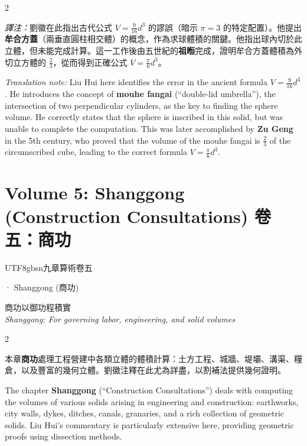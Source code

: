 \documentclass[10pt,a4paper]{article}
\begin{document}
\begin{paracol}{2}
\begin{leftcolumn*}
\textit{譯注：}劉徽在此指出古代公式 $V = \frac{9}{16}d^3$ 的謬誤（暗示 $\pi = 3$ 的特定配置）。他提出\textbf{牟合方蓋}（兩垂直圓柱相交體）的概念，作為求球體積的關鍵。他指出球內切於此立體，但未能完成計算。這一工作後由五世紀的\textbf{祖暅}完成，證明牟合方蓋體積為外切立方體的 $\frac{2}{3}$，從而得到正確公式 $V = \frac{\pi}{6}d^3$。
\end{leftcolumn*}
\begin{rightcolumn*}
\textit{Translation note:} Liu Hui here identifies the error in the ancient formula $V = \frac{9}{16}d^3$. He introduces the concept of \textbf{mouhe fangai} (``double-lid umbrella''), the intersection of two perpendicular cylinders, as the key to finding the sphere volume. He correctly states that the sphere is inscribed in this solid, but was unable to complete the computation. This was later accomplished by \textbf{Zu Geng} in the 5th century, who proved that the volume of the mouhe fangai is $\frac{2}{3}$ of the circumscribed cube, leading to the correct formula $V = \frac{\pi}{6}d^3$.
\end{rightcolumn*}
\end{paracol}

\newpage

\section{Volume 5: Shanggong (Construction Consultations) 卷五：商功}

\begin{volumeheader}{\begin{CJK}{UTF8}{gbsn}九章算術卷五\end{CJK} · Shanggong (商功)}
商功以御功程積實\\[0.2em]
\small\textit{Shanggong: For governing labor, engineering, and solid volumes}
\end{volumeheader}

\vspace{0.3cm}

\begin{paracol}{2}
\begin{leftcolumn*}
本章\textbf{商功}處理工程營建中各類立體的體積計算：土方工程、城牆、堤壩、溝渠、糧倉，以及豐富的幾何立體。劉徽注釋在此尤為詳盡，以割補法提供幾何證明。
\end{leftcolumn*}
\begin{rightcolumn*}
The chapter \textbf{Shanggong} (``Construction Consultations'') deals with computing the volumes of various solids arising in engineering and construction: earthworks, city walls, dykes, ditches, canals, granaries, and a rich collection of geometric solids. Liu Hui's commentary is particularly extensive here, providing geometric proofs using dissection methods.
\end{rightcolumn*}
\end{paracol}
\end{document}
